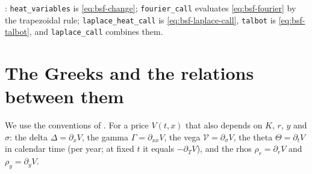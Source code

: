 \begin{incode}
: \texttt{heat\_variables} is \eqref{eq:bsf-change};
\texttt{fourier\_call} evaluates \eqref{eq:bsf-fourier} by the trapezoidal rule; \texttt{laplace\_heat\_call} is
\eqref{eq:bsf-laplace-call}, \texttt{talbot} is \eqref{eq:bsf-talbot}, and \texttt{laplace\_call} combines them.
\end{incode}


\section{The Greeks and the relations between them}\label{sec:bsf-greeks}

We use the conventions of . For a price $V(t,x)$ that also depends on $K$,
$r$, $y$ and $\sigma$: the delta $\Delta=\partial_xV$, the gamma $\Gamma=\partial_{xx}V$, the vega
$\mathcal V=\partial_\sigma V$, the theta $\Theta=\partial_tV$ in calendar time (per year; at fixed $t$ it
equals $-\partial_TV$), and the rhos $\rho_r=\partial_rV$ and $\rho_y=\partial_yV$.

